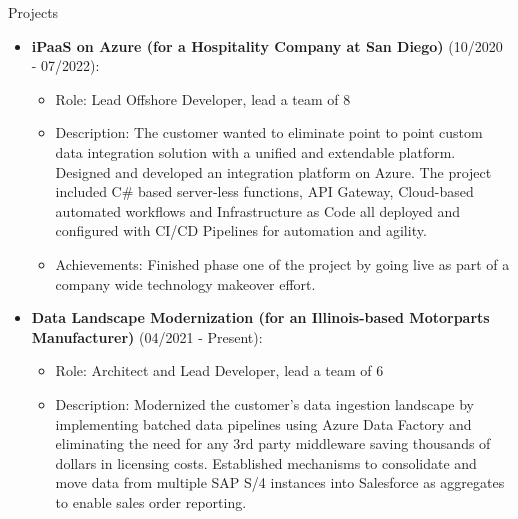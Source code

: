 \documentclass{resume} %
\begin{document}
	
	
	\begin{rSection}{Projects}
		\begin{itemize}
			\item \textbf{iPaaS on Azure (for a Hospitality Company at San Diego)} (10/2020 - 07/2022):
			\begin{itemize}
				\item Role: Lead Offshore Developer, lead a team of 8
				\item Description: The customer wanted to eliminate point to point custom data integration solution with a unified and extendable platform. Designed and developed an integration platform on Azure. The project included C\# based server-less functions, API Gateway, Cloud-based automated workflows and Infrastructure as Code all deployed and configured with CI/CD Pipelines for automation and agility.
				\item Achievements: Finished phase one of the project by going live as part of a company wide technology makeover effort.
			\end{itemize}
		\end{itemize}

		\begin{itemize}
			\item \textbf{Data Landscape Modernization (for an Illinois-based Motorparts Manufacturer)} (04/2021 - Present):
			\begin{itemize}
				\item Role: Architect and Lead Developer, lead a team of 6
				\item Description: Modernized the customer's data ingestion landscape by implementing batched data pipelines using Azure Data Factory and eliminating the need for any 3rd party middleware saving thousands of dollars in licensing costs. Established mechanisms to consolidate and move data from multiple SAP S/4 instances into Salesforce as aggregates to enable sales order reporting.
			\end{itemize}
		\end{itemize}
		

\end{rSection}
\end{document}
